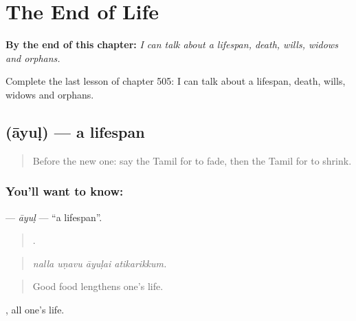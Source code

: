 
\chapter{The End of Life}
\label{ch:ta-the-end-of-life}

\begin{chapteropening}
\textbf{By the end of this chapter:} \emph{I can talk about a lifespan, death, wills, widows and orphans.}

Complete the last lesson of chapter 505: I can talk about a lifespan, death, wills, widows and orphans.
\end{chapteropening}

\section[\texorpdfstring{\ta{ஆயுள்} (āyuḷ)}{ஆயுள் (āyuḷ)}]{ (āyuḷ) — a lifespan}

\label{lesson:TA-C505-ayul}



\begin{quote}
Before the new one: say the Tamil for to fade, then the Tamil for to shrink.
\end{quote}

\subsection*{You'll want to know: }
\textbf{} — \emph{āyuḷ} — \textquotedblleft{}a lifespan\textquotedblright{}.

\begin{quote}
   .
\end{quote}

\begin{quote}
\emph{nalla uṇavu āyuḷai atikarikkum.}
\end{quote}

\begin{quote}
Good food lengthens one’s life.
\end{quote}

 , all one’s life.


